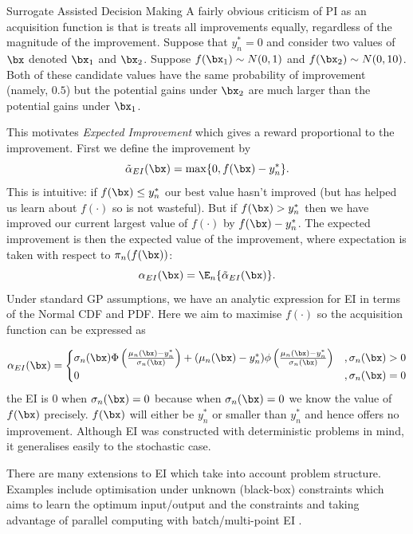 \begin{chapter}{Surrogate Assisted Decision Making \label{Chap:optimisation}}
A fairly obvious criticism of PI as an acquisition function is that is treats all improvements equally, regardless of the magnitude of the improvement. Suppose that $y^{*}_n = 0$ and consider two values of $\bx$ denoted $\bx_1$ and $\bx_2$. Suppose $f(\bx_1)  \sim N(0, 1)$ and $f(\bx_2) \sim N(0, 10)$. Both of these candidate values have the same probability of improvement (namely, $0.5$) but the potential gains under $\bx_2$ are much larger than the potential gains under $\bx_1$.

This motivates \textit{Expected Improvement} which gives a reward proportional to the improvement. First we define the improvement by
\begin{equation}
  \tilde{\alpha}_{EI}(\bx) = \max\{0, f(\bx)-y^{*}_n\}.
\end{equation}
This is intuitive: if $f(\bx) \leq y^{*}_n$ our best value hasn't improved (but has helped us learn about $f(\cdot)$ so is not wasteful). But if $f(\bx) > y^{*}_n$ then we have improved our current largest value of $f(\cdot)$ by $f(\bx) - y^{*}_n$. The expected improvement is then the expected value of the improvement, where expectation is taken with respect to $\pi_n(f(\bx))$:
\begin{equation}
  \alpha_{EI}(\bx)  = \E_n \{  \tilde{\alpha}_{EI}(\bx) \}.
\end{equation}
Under standard GP assumptions, we have an analytic expression for EI in terms of the Normal CDF and PDF.  Here we aim to maximise $f(\cdot)$ so the acquisition function can be expressed as

\begin{equation}
  \alpha_{EI}(\bx) = \begin{cases}
                      \sigma_n(\bx)\Phi\left(\frac{\mu_n(\bx)-y^{*}_n}{\sigma_n(\bx)}\right) + (\mu_n(\bx) - y_n^{*})\phi\left(\frac{\mu_n(\bx)-y^{*}_n}{\sigma_n(\bx)}\right)&  ,  \sigma_n(\bx) > 0 \\
                      0 & ,  \sigma_n(\bx) = 0
                      \end{cases}
\end{equation}
the EI is $0$ when $\sigma_n(\bx) = 0$ because when $\sigma_n(\bx) = 0$ we know the value of $f(\bx)$ precisely. $f(\bx)$ will either be $y_n^{*}$ or smaller than $y_n^{*}$ and hence offers no improvement. Although EI was constructed with deterministic problems in mind, it generalises easily to the stochastic case.

There are many extensions to EI which take into account problem structure. Examples include optimisation under unknown (black-box) constraints which aims to learn the optimum input/output and the constraints \citep{Gramacy2010} and taking advantage of parallel computing with batch/multi-point EI \citep{Marmin2015}.


\end{chapter}

